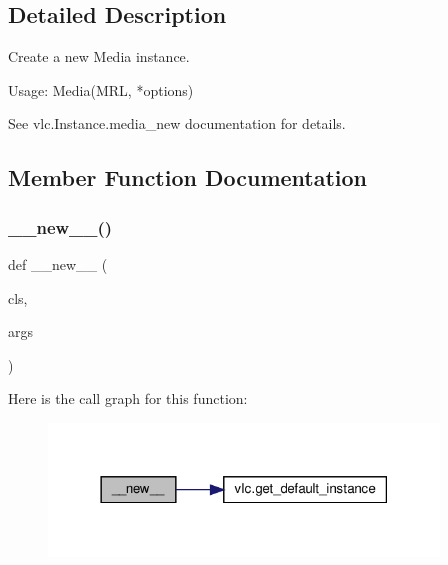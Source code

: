\subsection{Detailed Description}
\begin{DoxyVerb}Create a new Media instance.

Usage: Media(MRL, *options)

See vlc.Instance.media_new documentation for details.\end{DoxyVerb}
 

\subsection{Member Function Documentation}
\mbox{\label{classvlc_1_1_media_acc2aa3fac6a63e8bac4f19efc327102b}} 
\subsubsection{\texorpdfstring{\+\_\+\+\_\+new\+\_\+\+\_\+()}{\_\_new\_\_()}}
{\footnotesize\ttfamily def \+\_\+\+\_\+new\+\_\+\+\_\+ (\begin{DoxyParamCaption}\item[{}]{cls,  }\item[{}]{args }\end{DoxyParamCaption})}

Here is the call graph for this function\+:
\nopagebreak
\begin{figure}[H]
\begin{center}
\leavevmode
\includegraphics[width=294pt]{classvlc_1_1_media_acc2aa3fac6a63e8bac4f19efc327102b_cgraph}
\end{center}
\end{figure}
\mbox{\label{classvlc_1_1_media_a408d85bfeb76d82131e6e8e817c37e0d}} 
